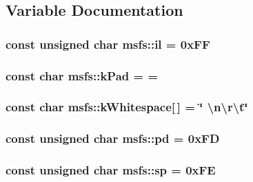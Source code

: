 \subsection{Variable Documentation}
\hypertarget{namespacemsfs_a381cc34886844e8885b4a6ed94dcf51a}{}
\subsubsection[{il}]{\setlength{\rightskip}{0pt plus 5cm}const unsigned char msfs\+::il = 0x\+F\+F\hspace{0.3cm}{\ttfamily [static]}}\label{namespacemsfs_a381cc34886844e8885b4a6ed94dcf51a}
\hypertarget{namespacemsfs_aa4ff5690906fd53a919808912f43f5af}{}
\subsubsection[{k\+Pad}]{\setlength{\rightskip}{0pt plus 5cm}const char msfs\+::k\+Pad = \textquotesingle{}=\textquotesingle{}\hspace{0.3cm}{\ttfamily [static]}}\label{namespacemsfs_aa4ff5690906fd53a919808912f43f5af}
\hypertarget{namespacemsfs_a2a9bbd74c1c30ddd07bc2a97353a179c}{}
\subsubsection[{k\+Whitespace}]{\setlength{\rightskip}{0pt plus 5cm}const char msfs\+::k\+Whitespace\mbox{[}$\,$\mbox{]} = \char`\"{} \textbackslash{}n\textbackslash{}r\textbackslash{}t\char`\"{}\hspace{0.3cm}{\ttfamily [static]}}\label{namespacemsfs_a2a9bbd74c1c30ddd07bc2a97353a179c}
\hypertarget{namespacemsfs_a7f0f18439623dfa004657c8cb9f3652c}{}
\subsubsection[{pd}]{\setlength{\rightskip}{0pt plus 5cm}const unsigned char msfs\+::pd = 0x\+F\+D\hspace{0.3cm}{\ttfamily [static]}}\label{namespacemsfs_a7f0f18439623dfa004657c8cb9f3652c}
\hypertarget{namespacemsfs_aee1f43d5dee94461e8512a201853e0ca}{}
\subsubsection[{sp}]{\setlength{\rightskip}{0pt plus 5cm}const unsigned char msfs\+::sp = 0x\+F\+E\hspace{0.3cm}{\ttfamily [static]}}\label{namespacemsfs_aee1f43d5dee94461e8512a201853e0ca}
